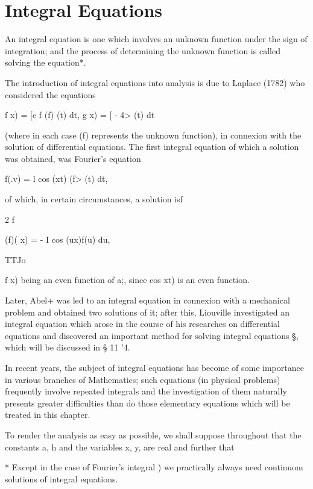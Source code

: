 %
%
\chapter{Integral Equations} 


An integral equation is one which involves an unknown function under
the sign of integration; and the process of determining the unknown
function is called solving the equation*.

The introduction of integral equations into analysis is due to Laplace
(1782) who considered the equations

f x) = [e f (f) (t) dt, g x) = [ - 4> (t) dt

(where in each case (f) represents the unknown function), in connexion
with the solution of differential equations. The first integral
equation of which a solution was obtained, was Fourier's equation

f(.v) = l cos (xt) (f> (t) dt,

of which, in certain circumstances, a solution isf

2 f

(f)( x) = - I cos (ux)f(u) du,

TTJo

f x) being an even function of a;, since cos xt) is an even function.

Later, Abel+ was led to an integral equation in connexion with a
mechanical problem and obtained two solutions of it; after this,
Liouville investigated an integral equation which arose in the course
of his researches on differential equations and discovered an
important method for solving integral equations §, which will be
discussed in § 11 '4.

In recent years, the subject of integral equations has become of some
importance in various branches of Mathematics; such equations (in
physical problems) frequently involve repeated integrals and the
investigation of them naturally presents greater difficulties than do
those elementary equations which will be treated in this chapter.

To render the analysis as easy as possible, we shall suppose
throughout that the constants a, h and the variables x, y, are real
and further that

* Except in the case of Fourier's integral ) we practically
always need continuom solutions of integral equations.

